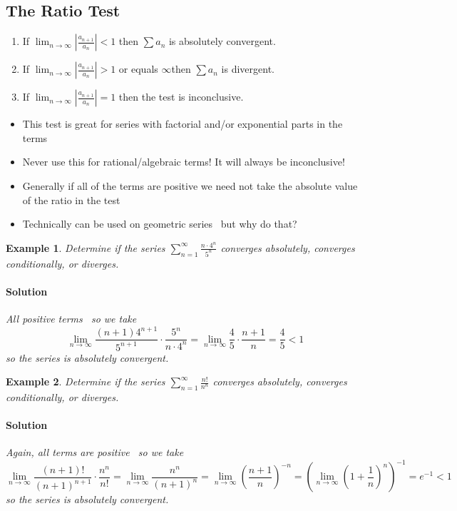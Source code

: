 \documentclass[letterpaper, 11pt, openany]{book}
\theoremstyle{mytheoremstyle}
\theoremstyle{myexamplestyle}
\newtheorem{example}{Example}[section]
\newenvironment{solution}{\paragraph{\sffamily \smaller \fontseries{b}\selectfont Solution}}{\hfill\faSquare}
\begin{document}
\subsection{The Ratio Test}
\begin{enumerate}
    \item If $\displaystyle \lim_{n \to \infty} \left| \frac{a_{n+1}}{a_{n}} \right| < 1$ then $\displaystyle \sum a_{n}$ is absolutely convergent.
    \item If $\displaystyle \lim_{n \to \infty} \left| \frac{a_{n+1}}{a_{n}} \right| > 1$ or equals \(\infty\)then $\displaystyle \sum a_{n}$ is divergent.
    \item If $\displaystyle \lim_{n \to \infty} \left| \frac{a_{n+1}}{a_{n}} \right| = 1$ then the test is inconclusive. \faFrown
\end{enumerate}
\begin{itemize}
    \item This test is great for series with factorial and/or exponential parts in the terms \faSmile
    \item[{\faExclamationTriangle[solid]}] Never use this for rational/algebraic terms! It will always be inconclusive! \faThumbsDown
    \item Generally if all of the terms are positive we need not take the absolute value of the ratio in the test \faSmile
    \item Technically can be used on geometric series \faMeh \ but why do that?
\end{itemize}

\begin{example}\label{e:ratiotestgeolike}
    Determine if the series $\displaystyle \sum_{n=1}^{\infty} \frac{n\cdot 4^{n}}{5^{n}}$ converges absolutely, converges conditionally, or diverges.
    \begin{solution}
        All positive terms \faSmile \ so we take
        \[\lim_{n \to \infty} \frac{(n+1)4^{n+1}}{5^{n+1}} \cdot \frac{5^{n}}{n\cdot 4^{n}} = \lim_{n \to \infty} \frac{4}{5} \cdot \frac{n+1}{n} = \frac{4}{5} < 1\]
        so the series is absolutely convergent.
    \end{solution}
\end{example}

\begin{example}\label{e:ratiotestfact}
    Determine if the series $\displaystyle \sum_{n=1}^{\infty} \frac{n!}{n^{n}}$ converges absolutely, converges conditionally, or diverges.
    \begin{solution}
        Again, all terms are positive \faSmile \ so we take
        \[\lim_{n \to \infty} \frac{(n+1)!}{(n+1)^{n+1}} \cdot \frac{n^{n}}{n!} = \lim_{n \to \infty} \frac{n^{n}}{(n+1)^{n}} = \lim_{n \to \infty} \left( \frac{n+1}{n} \right)^{-n} = \left( \lim_{n \to \infty} \left( 1 + \frac{1}{n} \right)^{n} \right)^{-1} = e^{-1} < 1\]
        so the series is absolutely convergent.
    \end{solution}
\end{example}
\end{document}
